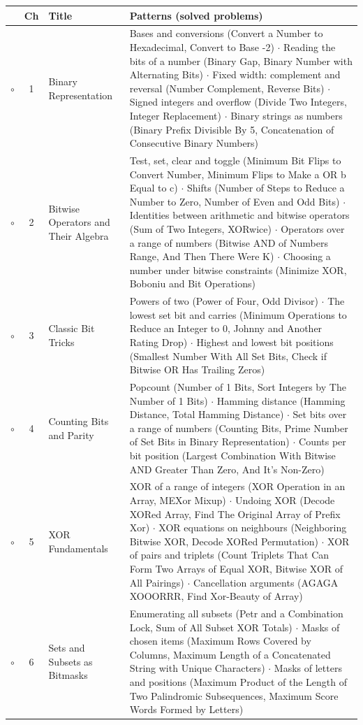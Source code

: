 \begin{tabularx}{\linewidth}{@{}c c >{\raggedright\arraybackslash}p{3.6cm} X@{}}
\toprule
& \textbf{Ch} & \textbf{Title} & \textbf{Patterns (solved problems)} \\
\midrule
$\circ$ & 1 & Binary Representation & Bases and conversions (Convert a Number to Hexadecimal, Convert to Base -2) $\cdot$ Reading the bits of a number (Binary Gap, Binary Number with Alternating Bits) $\cdot$ Fixed width: complement and reversal (Number Complement, Reverse Bits) $\cdot$ Signed integers and overflow (Divide Two Integers, Integer Replacement) $\cdot$ Binary strings as numbers (Binary Prefix Divisible By 5, Concatenation of Consecutive Binary Numbers) \\
$\circ$ & 2 & Bitwise Operators and Their Algebra & Test, set, clear and toggle (Minimum Bit Flips to Convert Number, Minimum Flips to Make a OR b Equal to c) $\cdot$ Shifts (Number of Steps to Reduce a Number to Zero, Number of Even and Odd Bits) $\cdot$ Identities between arithmetic and bitwise operators (Sum of Two Integers, XORwice) $\cdot$ Operators over a range of numbers (Bitwise AND of Numbers Range, And Then There Were K) $\cdot$ Choosing a number under bitwise constraints (Minimize XOR, Boboniu and Bit Operations) \\
$\circ$ & 3 & Classic Bit Tricks & Powers of two (Power of Four, Odd Divisor) $\cdot$ The lowest set bit and carries (Minimum Operations to Reduce an Integer to 0, Johnny and Another Rating Drop) $\cdot$ Highest and lowest bit positions (Smallest Number With All Set Bits, Check if Bitwise OR Has Trailing Zeros) \\
$\circ$ & 4 & Counting Bits and Parity & Popcount (Number of 1 Bits, Sort Integers by The Number of 1 Bits) $\cdot$ Hamming distance (Hamming Distance, Total Hamming Distance) $\cdot$ Set bits over a range of numbers (Counting Bits, Prime Number of Set Bits in Binary Representation) $\cdot$ Counts per bit position (Largest Combination With Bitwise AND Greater Than Zero, And It's Non-Zero) \\
$\circ$ & 5 & XOR Fundamentals & XOR of a range of integers (XOR Operation in an Array, MEXor Mixup) $\cdot$ Undoing XOR (Decode XORed Array, Find The Original Array of Prefix Xor) $\cdot$ XOR equations on neighbours (Neighboring Bitwise XOR, Decode XORed Permutation) $\cdot$ XOR of pairs and triplets (Count Triplets That Can Form Two Arrays of Equal XOR, Bitwise XOR of All Pairings) $\cdot$ Cancellation arguments (AGAGA XOOORRR, Find Xor-Beauty of Array) \\
$\circ$ & 6 & Sets and Subsets as Bitmasks & Enumerating all subsets (Petr and a Combination Lock, Sum of All Subset XOR Totals) $\cdot$ Masks of chosen items (Maximum Rows Covered by Columns, Maximum Length of a Concatenated String with Unique Characters) $\cdot$ Masks of letters and positions (Maximum Product of the Length of Two Palindromic Subsequences, Maximum Score Words Formed by Letters) \\
\bottomrule
\end{tabularx}

